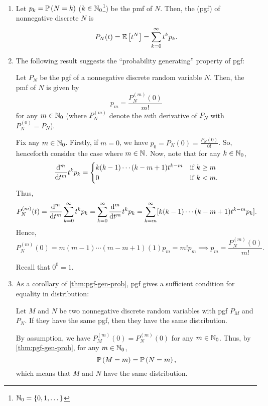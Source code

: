 \begin{enumerate}
\item Let \(p_k=\mathbb{P}\left(N=k\right)\) (\(k\in\mathbb{N}_0\)\footnote{\(\mathbb{N}_0=\{0,1,\dotsc\}\)})
be the pmf of \(N\). Then, the  (pgf) of
nonnegative discrete \(N\) is
\[
P_N(t)=\mathbb{E}\left[t^N\right]=\sum_{k=0}^{\infty}t^kp_k.
\]
\item The following result suggests the ``probability generating'' property of
pgf:
\begin{theorem}
\label{thm:pgf-gen-prob}
Let \(P_N\) be the pgf of a nonnegative discrete random variable \(N\). Then,
the pmf of \(N\) is given by
\[
p_m=\frac{P_N^{(m)}(0)}{m!}
\]
for any \(m\in\mathbb{N}_0\) (where \(P_N^{(m)}\) denote the \(m\)th derivative of
\(P_N\) with \(P_N^{(0)}=P_N\)).
\end{theorem}
\begin{pf}
Fix any \(m\in\mathbb{N}_0\). Firstly, if \(m=0\), we have \(\displaystyle
p_0=P_N(0)=\frac{P_N(0)}{0!}\). So, henceforth consider the case where
\(m\in\mathbb{N}\). Now, note that for any \(k\in\mathbb{N}_0\),
\[
\dv[m]{}{t}t^kp_k
=\begin{cases}
k(k-1)\dotsb(k-m+1)t^{k-m}&\text{if \(k\ge m\)}\\
0&\text{if \(k<m\)}.
\end{cases}
\]
Thus,
\[
P_N^{(m)}(t)=\dv[m]{}{t}\sum_{k=0}^{\infty}t^kp_k
=\sum_{k=0}^{\infty}\dv[m]{}{t}t^kp_k
=\sum_{k=m}^{\infty}[k(k-1)\dotsb(k-m+1)t^{k-m}p_k].
\]
Hence,
\[
P_N^{(m)}(0)=m(m-1)\dotsb(m-m+1)(1)p_m
=m!p_m\implies p_m=\frac{P_N^{(m)}(0)}{m!}.
\]
\begin{note}
Recall that \(0^0=1\).
\end{note}
\end{pf}

\item As a corollary of \cref{thm:pgf-gen-prob}, pgf gives a sufficient
condition for equality in distribution:
\begin{corollary}
\label{cor:pgf-equal-dist}
Let \(M\) and \(N\) be two nonnegative discrete random variables with pgf
\(P_M\) and \(P_N\). If they have the same pgf, then they have the same
distribution.
\end{corollary}
\begin{pf}
By assumption, we have \(P_M^{(m)}(0)=P_N^{(m)}(0)\) for any \(m\in\mathbb{N}_0\).
Thus, by \cref{thm:pgf-gen-prob}, for any \(m\in\mathbb{N}_0\),
\[
\mathbb{P}\left(M=m\right)=\mathbb{P}\left(N=m\right),
\]
which means that \(M\) and \(N\) have the same distribution.
\end{pf}


\end{enumerate}
